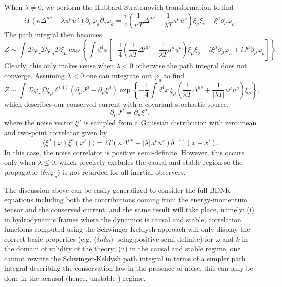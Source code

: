 \documentclass[aps,prd,nofootinbib,amsmath,amssymb,showpacs,longbibliography,singlecolumn,superscriptaddress,notitlepage]{revtex4-1}
\theoremstyle{plain}
\theoremstyle{definition}
\begin{document}
When $\lambda\neq 0$, we perform the Hubbard-Stratonovich transformation to find
\begin{equation}
    iT \left( \kappa \Delta^{\mu\nu} - \lambda  u^{\mu} u^{\nu} \right) \partial_\mu \varphi_a \partial_\nu \varphi_a = \frac{i}{4} \left(\frac{1}{\kappa T} \Delta^{\mu\nu} - \frac{1}{\lambda T} u^{\mu} u^{\nu} \right)\xi_{\mu} \xi_{\nu} - \xi^{\mu} \partial_\mu \varphi_a. 
\end{equation}
The path integral then becomes 
\begin{equation}
    Z \sim \int  \mathcal{D} \varphi_r \mathcal{D} \varphi_a\mathcal{D} \xi_{\mu} \exp \left\{ \int d^4x \left[ -\frac{1}{4} \left( \frac{1}{\kappa T} \Delta^{\mu\nu} - \frac{1}{\lambda T} u^{\mu} u^{\nu} \right) \xi_{\mu} \xi_{\nu} -i \xi^{\mu} \partial_\mu \varphi_a + iJ^{\mu} \partial_\mu \varphi_a \right] \right\} .
\end{equation}
Clearly, this only makes sense when $\lambda <0$ otherwise the path integral does not converge. Assuming $\lambda <0$ one can integrate out $\varphi_a$ to find
\begin{equation}
    Z \sim \int \mathcal{D}\varphi_r \mathcal{D} \xi_{\mu}\, \delta^{(4)} \left(\partial_\mu J^{\mu} - \partial_\mu\xi^{\mu} \right) \exp\left\{- \frac{1}{4}\int d^4x\, \xi_{\mu} \left( \frac{1}{\kappa T} \Delta^{\mu\nu} + \frac{1}{|\lambda T|} u^{\mu} u^{\nu} \right) \xi_{\nu}\right\},
\end{equation}
which describes our conserved current with a covariant stochastic source, 
\begin{equation}
\partial_{\mu} J^{\mu} = \partial_{\mu} \xi^{\mu} ,
\end{equation}
where the noise vector $\xi^{\mu}$ is sampled from a Gaussian distribution with zero mean and two-point correlator given by
\begin{equation}
    \langle \xi^{\mu}(x) \xi^{\nu}(x') \rangle = 2 T\left( \kappa \Delta^{\mu\nu} + |\lambda| u^{\mu} u^{\nu} \right) \delta^{(4)}(x-x') .
    \label{noise_2}
\end{equation}
In this case, the noise correlator is positive semi-definite. However, this occurs only when $\lambda \leq 0$, which precisely excludes the causal and stable region so the propagator $\langle \delta n \varphi_a\rangle$ is not retarded for all inertial observers. 

The discussion above can be easily generalized to consider the full BDNK equations \cite{BemficaDisconziNoronha,Kovtun:2019hdm,Bemfica:2019knx,Bemfica:2020zjp, Hoult:2020eho} including both the contributions coming from the energy-momentum tensor and the conserved current, and the same result will take place, namely: (i) in hydrodynamic frames where the dynamics is causal and stable, correlation functions computed using the Schwinger-Keldysh approach will only display the correct basic properties (e.g. $\langle \delta n \delta n\rangle$ being positive semi-definite) for $\omega$ and $k$ in the domain of validity of the theory; (ii) in the causal and stable regime, one cannot rewrite the Schwinger-Keldysh path integral in terms of a simpler path integral describing the conservation law in the presence of noise, this can  only be done in the acausal (hence, unstable  \cite{Gavassino:2021owo}) regime.
\end{document}
